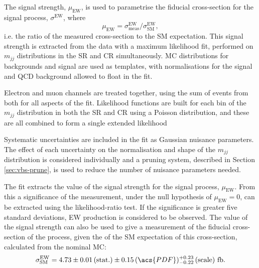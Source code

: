 
The signal strength, $\mu_\text{EW}$, is used to parametrise the fiducial
cross-section for the signal process, $\sigma^\text{EW}$, where
%
\begin{equation}
  \mu_\text{EW} = \sigma^\text{EW}_\text{meas} / \sigma^\text{EW}_\text{SM},
  \label{eqn:vbs-fit-mu}
\end{equation}
%
i.e. the ratio of the measured cross-section to the \ac{SM} expectation. This
signal strength is extracted from the data with a maximum likelihood fit,
performed on $m_{jj}$ distributions in the \ac{SR} and \ac{CR} simultaneously.
\ac{MC} distributions for backgrounds and signal are used as templates, with
normalisations for the signal and \ac{QCD} \Zy background allowed to float in
the fit.

Electron and muon channels are treated together, using the sum of events from
both for all aspects of the fit.  Likelihood functions are built for each bin of
the $m_{jj}$ distribution in both the \ac{SR} and \ac{CR} using a Poisson
distribution, and these are all combined to form a single extended likelihood

Systematic uncertainties are included in the fit as Gaussian nuisance
parameters. The effect of each uncertainty on the normalisation and shape of the
$m_{jj}$ distribution is considered individually and a pruning system, described
in Section \ref{sec:vbs-prune}, is used to reduce the number of nuisance
parameters needed.

The fit extracts the value of the signal strength for the signal process,
$\mu_\text{EW}$. From this a significance of the measurement, under the null
hypothesis of $\mu_\text{EW}=0$, can be extracted using the likelihood-ratio
test. If the significance is greater five standard deviations, \ac{EW} \Zy
production is considered to be observed. The value of the signal strength can
also be used to give a measurement of the fiducial cross-section of the process,
given the of the \ac{SM} expectation of this cross-section, calculated from the
nominal \ac{MC}:
%
\begin{equation*}
  \sigma^\text{EW}_\text{SM} = 4.73
  \pm 0.01 \, (\text{stat.})
  \pm 0.15 \, (\acs{PDF})
  ^{+0.23} _{-0.22} \, (\text{scale})
  ~\text{fb}.
\end{equation*}

